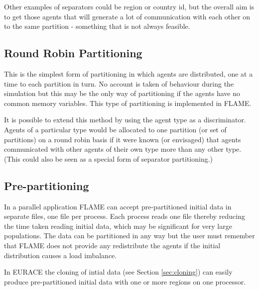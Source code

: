 Other examples of separators could be region or country id, but the overall aim is to get those agents that will generate a lot of communication with each other on to the same partition - something that is not always feasible.

\subsection{Round Robin Partitioning}

This is the simplest form of partitioning in which agents are distributed, one at a time to each partition in turn. No account is taken of behaviour during the simulation but this may be the only way of partitioning if the agents have no common memory variables. This type of partitioning is implemented in FLAME.

It is possible to extend this method by using the agent type as a discriminator. Agents of a particular type would be allocated to one partition (or set of partitions) on a round robin basis if it were known (or envisaged) that agents communicated with other agents of their own type more than any other type. (This could also be seen as a special form of separator partitioning.)

\subsection{Pre-partitioning}

In a parallel application FLAME can accept pre-partitioned initial data in separate files, one file per process. Each process reads one file thereby reducing the time taken reading initial data, which may be significant for very large populations. The data can be partitioned in any way but the user must remember that FLAME does not provide any redistribute the agents if the initial distribution causes a load imbalance.

In EURACE the cloning of intial data (see Section \ref{sec:cloning}) can easily produce pre-partitioned initial data with one or more regions on one processor.
